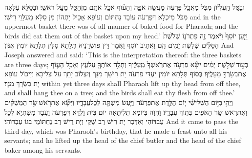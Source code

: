 {וּבַסַּ֣ל הָֽעֶלְי֗וֹן מִכֹּ֛ל מַאֲכַ֥ל פַּרְעֹ֖ה מַעֲשֵׂ֣ה אֹפֶ֑ה וְהָע֗וֹף אֹכֵ֥ל אֹתָ֛ם מִן\maqqaf הַסַּ֖ל מֵעַ֥ל רֹאשִֽׁי׃}
{וּבְסַלָּא עִלָּאָה מִכֹּל מֵיכְלָא דְּפַרְעֹה עוֹבָד נַחְתּוֹם וְעוֹפָא אָכֵיל יָתְהוֹן מִן סַלָּא מֵעִלָּוֵי רֵישִׁי׃}
{and in the uppermost basket there was of all manner of baked food for Pharaoh; and the birds did eat them out of the basket upon my head.’}{}
{וַיַּ֤עַן יוֹסֵף֙ וַיֹּ֔אמֶר זֶ֖ה פִּתְרֹנ֑וֹ שְׁלֹ֙שֶׁת֙ הַסַּלִּ֔ים שְׁלֹ֥שֶׁת יָמִ֖ים הֵֽם׃}
{וַאֲתֵיב יוֹסֵף וַאֲמַר דֵּין פּוּשְׁרָנֵיהּ תְּלָתָא סַלִּין תְּלָתָא יוֹמִין אִנּוּן׃}
{And Joseph answered and said: ‘This is the interpretation thereof: the three baskets are three days;}{}
{בְּע֣וֹד \legarmeh  שְׁלֹ֣שֶׁת יָמִ֗ים יִשָּׂ֨א פַרְעֹ֤ה אֶת\maqqaf רֹֽאשְׁךָ֙ מֵֽעָלֶ֔יךָ וְתָלָ֥ה אוֹתְךָ֖ עַל\maqqaf עֵ֑ץ וְאָכַ֥ל הָע֛וֹף אֶת\maqqaf בְּשָׂרְךָ֖ מֵעָלֶֽיךָ׃}
{בְּסוֹף תְּלָתָא יוֹמִין יַעְדֵּי פַרְעֹה יָת רֵישָׁךְ מִנָּךְ וְיִצְלוֹב יָתָךְ עַל צְלִיבָא וְיֵיכוֹל עוֹפָא יָת בִּשְׂרָךְ מִנָּךְ׃}
{within yet three days shall Pharaoh lift up thy head from off thee, and shall hang thee on a tree; and the birds shall eat thy flesh from off thee.’}{}
{וַיְהִ֣י \legarmeh  בַּיּ֣וֹם הַשְּׁלִישִׁ֗י י֚וֹם הֻלֶּ֣דֶת אֶת\maqqaf פַּרְעֹ֔ה וַיַּ֥עַשׂ מִשְׁתֶּ֖ה לְכׇל\maqqaf עֲבָדָ֑יו וַיִּשָּׂ֞א אֶת\maqqaf רֹ֣אשׁ \legarmeh  שַׂ֣ר הַמַּשְׁקִ֗ים וְאֶת\maqqaf רֹ֛אשׁ שַׂ֥ר הָאֹפִ֖ים בְּת֥וֹךְ עֲבָדָֽיו׃}
{וַהֲוָה בְּיוֹמָא תְּלִיתָאָה יוֹם בֵּית וַלְדָּא דְּפַרְעֹה וַעֲבַד מִשְׁתְּיָא לְכָל עַבְדּוֹהִי וְאִדְּכַר יָת רֵישׁ רַב שָׁקֵי וְיָת רֵישׁ רַב נַחְתּוֹמֵי בְּגוֹ עַבְדּוֹהִי׃}
{And it came to pass the third day, which was Pharaoh’s birthday, that he made a feast unto all his servants; and he lifted up the head of the chief butler and the head of the chief baker among his servants.}{}
